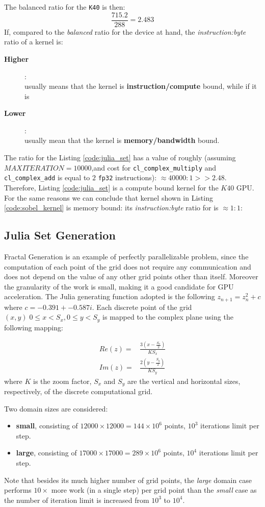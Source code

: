 The balanced ratio for the \texttt{K40} is then:\[\frac{715.2}{288} = 2.483\]
If, compared to the \textit{balanced} ratio for the device at hand, the \textit{instruction:byte} ratio of a kernel is: 
\begin{description}
	\item[\textbf{Higher}]:\\usually means that the kernel is \textbf{instruction/compute} bound, while if it is
	\item[\textbf{Lower}]:\\usually mean that the kernel is \textbf{memory/bandwidth} bound.
\end{description}

The ratio for the Listing \ref{code:julia_set} has a value of roughly (assuming $MAXITERATION=10000$,and cost for \texttt{cl\_complex\_multiply} and \texttt{cl\_complex\_add} is equal to $2$ \texttt{fp32} instructions): $\approx 40000:1 >> 2.48$. Therefore, Listing \ref{code:julia_set} is a compute bound kernel for the $K40$ GPU.
For the same reasons we can conclude that kernel shown in Listing  \ref{code:sobel_kernel} is memory bound: its \textit{instruction:byte} ratio for is $\approx 1:1$:  

\subsection{Julia Set Generation}
Fractal Generation is an example of perfectly parallelizable problem, since the computation of each point of the grid does not require any communication and does not depend on the value of any other grid points other than itself. Moreover the granularity of the work is small, making it a good candidate for GPU acceleration.
The Julia generating function adopted is the following $z_{n+1} = z^2_n + c$ where $c=-0.391+-0.587i$. Each discrete point of the grid $(x,y)\; 0\leq x < S_x, 0\leq y < S_y$ is mapped to the complex plane using the following mapping:

\begin{align*}
	Re(z)=&\frac{3(x-\frac{S_x}{2})}{K S_x} \\
	Im(z)=&\frac{2(y-\frac{S_y}{2})}{K S_y}
\end{align*}
where $K$ is the zoom factor, $S_x$ and $S_y$ are the vertical and horizontal sizes, respectively, of the discrete computational grid.

Two domain sizes are considered:
	\begin{itemize}
		\item \textbf{small}, consisting of  $12000 \times 12000 = 144 \times 10^6$ points, $10^3$ iterations limit per step.
		\item \textbf{large}, consisting of $17000 \times 17000 = 289 \times 10^6$ points, $10^4$ iterations limit per step.
	\end{itemize}
Note that besides its much higher number of grid points, the \textit{large} domain case performs $10 \times$ more work (in a single step) per grid point than the \textit{small} case as the number of iteration limit is increased from $10^3$ to $10^4$.

